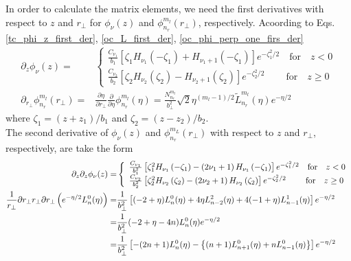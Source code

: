 In order to calculate the matrix elements, we need the first derivatives with respect to $z$ and $r_\perp$ for $\phi_\nu(z)$ and $\phi_{n_r}^{m_l}(r_\perp)$, respectively. Acoording to Eqs.\eqref{tc_phi_z_first_der}, \eqref{oc_L_first_der}, \eqref{oc_phi_perp_one_firs_der}
\begin{align}
\partial_{z} \phi_{\nu}(z)=& \left\{\begin{array}{l}
  \frac{C_{\nu_{1}}}{b_{1}}\left[\zeta_{1} H_{\nu_{1}}\left(-\zeta_{1}\right)+H_{\nu_{1}+1}\left(-\zeta_{1}\right)\right] e^{-\zeta_{1}^{2} / 2}  \quad  \text{for} \quad z < 0\\
  \frac{C_{\nu_{2}}}{b_{2}}\left[\zeta_{2} H_{\nu_{2}}\left(\zeta_{2}\right)-H_{\nu_{2}+1}\left(\zeta_{2}\right)\right] e^{-\zeta_{2}^{2} / 2}  \quad \quad ~ \text{for} \quad z \geq 0
\end{array}\right.  \\
\partial_{r_{\perp}} \phi_{n_{r}}^{m_{l}}\left(r_{\perp}\right)=&\frac{\partial \eta}{\partial r_{\perp}} \frac{\partial}{\partial \eta} \phi_{n_{r}}^{m_{l}}(\eta)=\frac{N_{n_{r}}^{m_{l}}}{b_{\perp}^{2}} \sqrt{2} \eta^{\left(m_{l}-1\right) / 2} \tilde{L}_{n_{r}}^{m_{l}}(\eta) e^{-\eta / 2}
\end{align}
where $\zeta_1 = (z + z_1) / b_1$ and $\zeta_2 = (z - z_2) / b_2$. \\
The second derivative of $\phi_\nu(z)$ and $\phi_{n_r}^{m_L}(r_\perp)$ with respect to $z$ and $r_\perp$, respectively, are take the form 
\begin{align}
\partial_{z} \partial_{z} \phi_{\nu}(z)=&\left\{\begin{array}{l}
  \frac{C_{\nu_{1}}}{b_{1}^{2}}\left[\zeta_{1}^{2} H_{\nu_{1}}\left(-\zeta_{1}\right)-\left(2 \nu_{1}+1\right) H_{\nu_{1}}\left(-\zeta_{1}\right)\right] e^{-\zeta_{1}^{2} / 2}   \quad  \text{for} \quad z < 0\\
  \frac{C_{\nu_{2}}}{b_{2}^{2}}\left[\zeta_{2}^{2} H_{\nu_{2}}\left(\zeta_{2}\right)-\left(2 \nu_{2}+1\right) H_{\nu_{2}}\left(\zeta_{2}\right)\right] e^{-\zeta_{2}^{2} / 2}  \quad  \quad ~ \text{for} \quad z \geq 0
\end{array}\right.  \\
\frac{1}{r_{\perp}} \partial r_{\perp} r_{\perp} \partial r_{\perp}\left(e^{-\eta / 2} L_{n}^{0}(\eta)\right) =& \frac{1}{b_{\perp}^{2}}\left[(-2+\eta) L_{n}^{0}(\eta)+4 \eta L_{n-2}^{2}(\eta)+4(-1+\eta) L_{n-1}^{1}(\eta)\right] e^{-\eta / 2} \notag \\
=&\frac{1}{b_{\perp}^{2}}(-2+\eta-4 n) L_{n}^{0}(\eta) e^{-\eta / 2} \\
=&\frac{1}{b_{\perp}^{2}}\left[-(2 n+1) L_{n}^{0}(\eta)-\left\{(n+1) L_{n+1}^{0}(\eta)+n L_{n-1}^{0}(\eta)\right\}\right] e^{-\eta / 2} \notag
\end{align}
